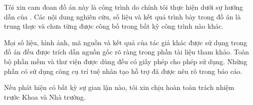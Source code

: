 \begin{declaration}

Tôi xin cam đoan đồ án này là công trình do chính tôi thực hiện dưới sự
hướng dẫn của \dauGVHD. Các nội dung nghiên cứu, số liệu và kết quả trình
bày trong đồ án là trung thực và chưa từng được công bố trong bất kỳ công
trình nào khác.

Mọi số liệu, hình ảnh, mã nguồn và kết quả của tác giả khác được sử dụng
trong đồ án đều được trích dẫn nguồn gốc rõ ràng trong phần tài liệu tham
khảo. Toàn bộ phần mềm và thư viện được dùng đều có giấy phép cho phép sử
dụng. Những phần có sử dụng công cụ trí tuệ nhân tạo hỗ trợ đã được nêu rõ
trong báo cáo.

Nếu phát hiện có bất kỳ sự gian lận nào, tôi xin chịu hoàn toàn trách nhiệm
trước Khoa và Nhà trường.

\vspace{1.4em}
\hfill{}

\end{declaration}
